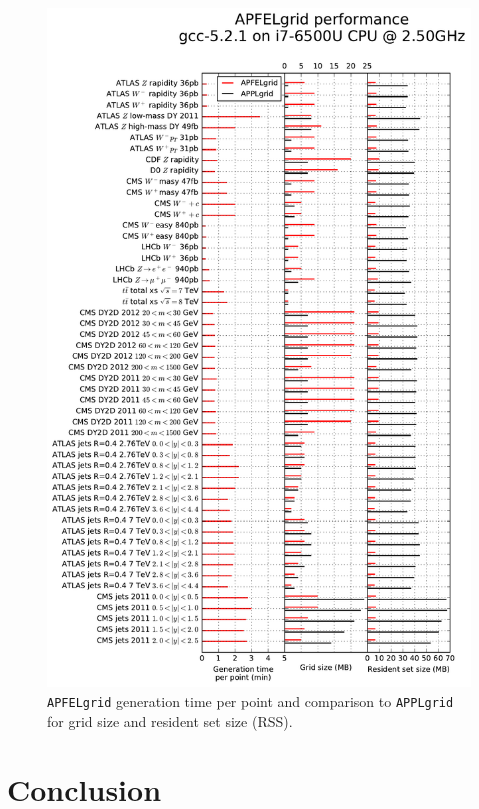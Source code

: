 \documentclass[preprint,12pt]{elsarticle}
\begin{document}
\begin{figure}
  \centering                                      
  \includegraphics[scale=0.6]{plots/t0b}
\caption{\small {\tt APFELgrid} generation time per point and
  comparison to {\tt APPLgrid} for grid size and resident set size
  (RSS).}
\label{fig:performance}
\end{figure}


\section{Conclusion}
\label{sec:conclusion}
\end{document}
